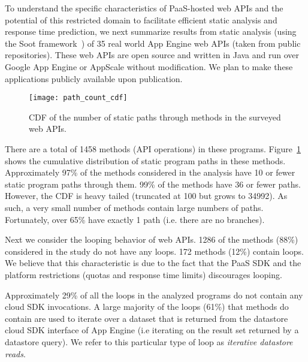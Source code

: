 To understand the specific characteristics of PaaS-hosted web APIs and the potential
of this restricted domain to facilitate efficient static analysis and response time 
prediction,  we next summarize results from static analysis (using the Soot
framework~\cite{Vallee-Rai:2010:SJB:1925805.1925818}) of 
35 real world App Engine web APIs (taken from public 
repositories). These web APIs are open 
source and written in Java and run over Google App Engine or AppScale without modification.
We plan to make these applications publicly available upon publication.  

\begin{figure}
\centering
\texttt{[image: path\_count\_cdf]}
\caption{CDF of the number of static paths through methods in the surveyed web APIs.
\label{fig:path_count_cdf}
}
\vspace{-0.2in}
\end{figure}

There are a total of 1458 methods (API operations) in these programs.
Figure~\ref{fig:path_count_cdf} shows the cumulative distribution of 
static program paths in these methods.
Approximately 97\% of the methods considered in the analysis have 10 or fewer 
static program paths through them.  99\% of 
the methods have 36 or fewer paths.
However, the CDF is heavy tailed
(truncated at 100 but grows to 34992). As such, 
a very small number of methods 
contain large numbers of paths.
Fortunately, over 65\% have exactly 1 path (i.e. there are no branches).

Next we consider the looping behavior of web APIs.  1286 of the methods (88\%)
considered in the study
do not have any loops. 172 methods (12\%) contain loops. 
We believe that this characteristic is due to the fact that 
the PaaS SDK and the platform restrictions (quotas and response time limits) 
discourages looping.

Approximately 29\% of all the loops in 
the analyzed programs do not contain any cloud SDK invocations. 
A large majority of the loops (61\%) that methods do contain are
used to iterate over a dataset that is returned from the datastore cloud SDK interface 
of App Engine (i.e iterating on the result set 
returned by a datastore query). We refer to this particular type of 
loop as \textit{iterative datastore reads}. 

